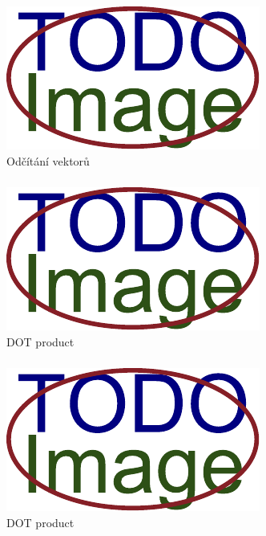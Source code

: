 \begin{figure}[H]
	\centering
	\includegraphics[width=.5\linewidth]{obrazky-figures/placeholder.pdf}
	\caption{Odčítání vektorů}
	\label{fig:lineární-algebra:odčítání}
\end{figure}

\subsubsection*{}

\begin{figure}[H]
	\centering
	\includegraphics[width=.5\linewidth]{obrazky-figures/placeholder.pdf}
	\caption{DOT product}
	\label{fig:lineární-algebra:dot}
\end{figure}

\subsubsection*{}

\begin{figure}[H]
	\centering
	\includegraphics[width=.5\linewidth]{obrazky-figures/placeholder.pdf}
	\caption{DOT product}
	\label{fig:lineární-algebra:cross}
\end{figure}

